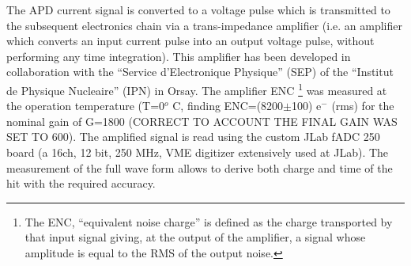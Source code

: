 
The APD current signal is converted to a
voltage pulse which is transmitted to the subsequent
electronics chain via a trans-impedance
amplifier (i.e. an amplifier which converts an
input current pulse into an output voltage
pulse, without performing any time integration).
This amplifier has been developed in
collaboration with the “Service d’Electronique
Physique” (SEP) of the “Institut de Physique
Nucleaire” (IPN) in Orsay. The amplifier ENC \footnote{The ENC, “equivalent noise charge” is defined as the
charge transported by that input signal giving, at the
output of the amplifier, a signal whose amplitude is equal
to the RMS of the output noise.} was measured at the operation temperature (T=0$^o$ C,  finding ENC=(8200$\pm$100) e$^-$ (rms) for the nominal gain of G=1800 (CORRECT TO ACCOUNT THE FINAL GAIN WAS SET TO 600). 
The amplified signal is read using the custom JLab fADC  250 board (a 16ch, 12 bit, 250 MHz, VME digitizer extensively used at JLab). The measurement of the full wave form allows to derive both charge and time of the hit with the required   accuracy.

